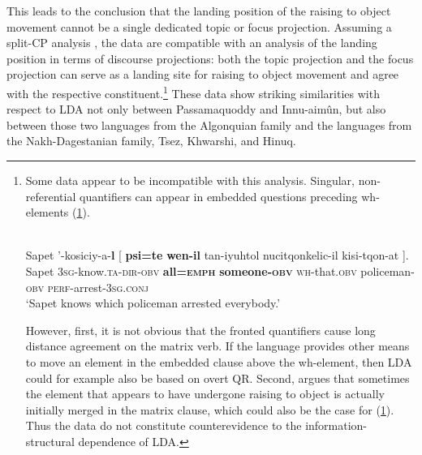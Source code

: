 \documentclass[output=paper
,modfonts
,nonflat]{langsci/langscibook}
\begin{document}
This leads \citet{Bruening2001a} to the conclusion that the landing position of the raising to object movement cannot be a single dedicated topic or focus projection. Assuming a split-CP analysis \citep{Rizzi1997}, the data are compatible with an analysis of the landing position in terms of discourse projections: both the topic projection and the focus projection can serve as a landing site for raising to object movement and agree with the respective constituent.\footnote{Some data appear to be incompatible with this analysis. Singular, non-referential quantifiers can appear in embedded questions preceding wh-elements (\ref{ex:passam_qr}).
\begin{exe}
\label{ex:passam_qr}\\ %
	\gll Sapet '-kosiciy-a-\textbf{l} [ \textbf{psi=te} \textbf{wen-il} tan-iyuhtol nucitqonkelic-il kisi-tqon-at ].\\
		 Sapet \textsc{3sg}-know.\textsc{ta-dir-obv} {} \textbf{all=\textsc{emph}} \textbf{someone-\textsc{obv}}  \textsc{wh}-that.\textsc{obv} policeman-\textsc{obv} \textsc{perf}-arrest-\textsc{3sg.conj}\\
	\glt `Sapet knows which policeman arrested everybody.'
\end{exe}
However, first, it is not obvious that the fronted quantifiers cause long distance agreement on the matrix verb. If the language provides other means to move an element in the embedded clause above the wh-element, then LDA could for example also be based on overt QR. Second, \citet{Bruening2001a} argues that sometimes the element that appears to have undergone raising to object is actually initially merged in the matrix clause, which could also be the case for (\ref{ex:passam_qr}). Thus the data do not constitute counterevidence to the information-structural dependence of LDA.} These data show striking similarities with respect to LDA not only between Passamaquoddy and Innu-aim\^{u}n, but also between those two languages from the Algonquian family and the languages from the Nakh-Dagestanian family, Tsez, Khwarshi, and Hinuq.
\end{document}

